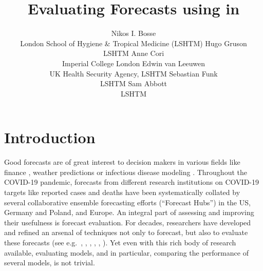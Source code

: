 \documentclass[
]{jss}
\author{
Nikos I. Bosse\\London School of Hygiene \& Tropical Medicine (LSHTM)
\AND Hugo Gruson\\LSHTM \And Anne Cori\\Imperial College London
\AND Edwin van Leeuwen\\UK Health Security Agency,
LSHTM \And Sebastian Funk\\LSHTM \And Sam Abbott\\LSHTM
}
\title{Evaluating Forecasts using \pkg{scoringutils} in \proglang{R}}
\begin{document}
\hypertarget{introduction}{%
\section{Introduction}\label{introduction}}

Good forecasts are of great interest to decision makers in various
fields like finance
\citep{timmermannForecastingMethodsFinance2018, elliottForecastingEconomicsFinance2016},
weather predictions
\citep{gneitingWeatherForecastingEnsemble2005, kukkonenReviewOperationalRegionalscale2012}
or infectious disease modeling
\citep{reichCollaborativeMultiyearMultimodel2019, funkShorttermForecastsInform2020, cramerEvaluationIndividualEnsemble2021, bracherShorttermForecastingCOVID192021, europeancovid-19forecasthubEuropeanCovid19Forecast2021}.
Throughout the COVID-19 pandemic, forecasts from different research
institutions on COVID-19 targets like reported cases and deaths have
been systematically collated by several collaborative ensemble
forecasting efforts (``Forecast Hubs'') in the US, Germany and Poland,
and Europe. An integral part of assessing and improving their usefulness
is forecast evaluation. For decades, researchers have developed and
refined an arsenal of techniques not only to forecast, but also to
evaluate these forecasts (see e.g.~\cite{goodRationalDecisions1952},
\cite{epsteinScoringSystemProbability1969, murphyNoteRankedProbability1971a, mathesonScoringRulesContinuous1976},
\cite{gneitingProbabilisticForecastsCalibration2007},
\cite{funkAssessingPerformanceRealtime2019},
\cite{gneitingStrictlyProperScoring2007},
\cite{bracherEvaluatingEpidemicForecasts2021}). Yet even with this rich
body of research available, evaluating models, and in particular,
comparing the performance of several models, is not trivial.
\end{document}
